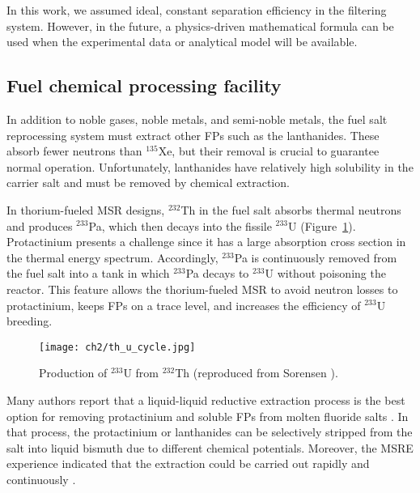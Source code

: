 In this work, we assumed ideal, constant separation efficiency in the 
filtering system. However, in the future, a physics-driven mathematical  
formula can be used when the experimental data or analytical model will be
available.


\subsection{Fuel chemical processing facility} \label{sec:chemical_processing}
In addition to noble gases, noble metals, and semi-noble metals, the fuel salt 
reprocessing system must extract other \glspl{FP} such as the lanthanides. 
These absorb fewer neutrons than $^{135}$Xe, but their removal is crucial to 
guarantee normal operation. Unfortunately, lanthanides have relatively high 
solubility in the carrier salt and must be removed by chemical extraction. 

In thorium-fueled \gls{MSR} designs, $^{232}$Th in the fuel salt absorbs 
thermal neutrons and produces $^{233}$Pa, which then decays into the fissile 
$^{233}$U (Figure~\ref{fig:th_u_reaction}). Protactinium presents a challenge  
since it has a large absorption cross section in the thermal energy spectrum. 
Accordingly, $^{233}$Pa is continuously removed from the fuel salt into a tank 
in which $^{233}$Pa decays to $^{233}$U without poisoning the reactor. This 
feature allows the thorium-fueled \gls{MSR} to avoid neutron losses to 
protactinium, keeps \glspl{FP} on a trace level, and increases the efficiency 
of $^{233}$U breeding. 
\begin{figure}[htp!] %
	\centering
	\texttt{[image: ch2/th\_u\_cycle.jpg]}
	\caption{Production of $^{233}$U from $^{232}$Th  (reproduced from 
	Sorensen \cite{sorensen_one-fluid_2006}).}
	\label{fig:th_u_reaction}
\end{figure}

Many authors report that a liquid-liquid reductive extraction process is the 
best option for removing protactinium and soluble \glspl{FP} from 
molten fluoride salts \cite{briggs_molten-salt_1969, delpech_molten_2010, 
doligez_coupled_2014}. In that process, the protactinium or lanthanides can be 
selectively stripped from the salt into liquid bismuth due to different  
chemical potentials. Moreover, the \gls{MSRE} experience indicated that the 
extraction could be carried out rapidly and continuously  
\cite{whatley_engineering_1970}.

